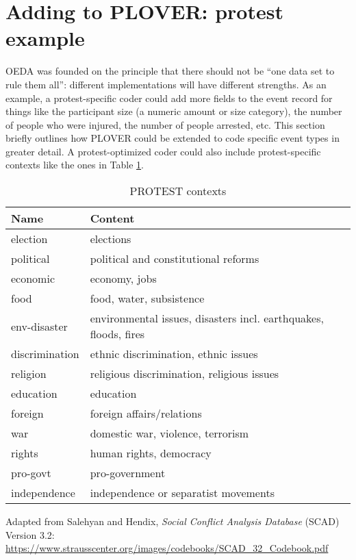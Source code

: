 \documentclass[11pt]{report}
\begin{document}
\clearpage

\section{Adding to PLOVER: protest example}\label{sec:adding_to_plover}


OEDA was founded on the principle that there should not be ``one data set to rule them all'': different implementations will have different strengths. As an example, a protest-specific coder could add more fields to the event record for things like the participant size (a numeric amount or size category), the number of people who were injured, the number of people arrested, etc. This section briefly outlines how PLOVER could be extended to code specific event types in greater detail. A protest-optimized coder could also include protest-specific contexts like the ones in Table \ref{tab:protestcontext}.

\begin{table}[htp]
\caption{PROTEST contexts}
\begin{center}
\begin{tabular}{|l|l|}
\hline
Name & Content \\
\hline
election   &   elections\\
political   &   political and constitutional reforms\\
economic &   economy, jobs\\
food           &   food, water, subsistence\\
env-disaster            &   environmental issues, disasters incl. earthquakes, floods, fires\\
discrimination            &   ethnic discrimination, ethnic issues\\
religion           &   religious discrimination, religious issues\\
education            &   education\\
foreign            &   foreign affairs/relations\\
war            &   domestic war, violence, terrorism\\
rights             &   human rights, democracy\\
pro-govt             &   pro-government\\
independence & independence or separatist movements\\
\hline
\end{tabular}
\end{center}
\label{tab:protestcontext}
\raggedright{Adapted from Salehyan and Hendix, \textit{Social Conflict Analysis Database} (SCAD)
Version 3.2: \url{https://www.strausscenter.org/images/codebooks/SCAD\_32\_Codebook.pdf}}\\~
\end{table}
\end{document}

